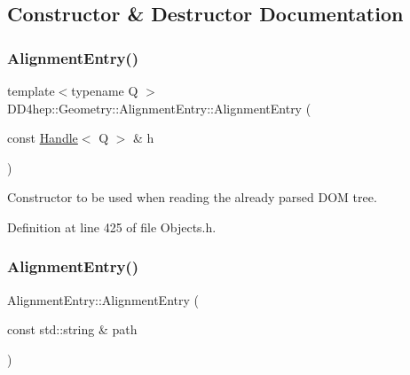 \subsection{Constructor \& Destructor Documentation}
\hypertarget{class_d_d4hep_1_1_geometry_1_1_alignment_entry_ad4ffe383c34e94bd490725fedbc4607c}{}\label{class_d_d4hep_1_1_geometry_1_1_alignment_entry_ad4ffe383c34e94bd490725fedbc4607c} 
\subsubsection{\texorpdfstring{Alignment\+Entry()}{AlignmentEntry()}\hspace{0.1cm}{\footnotesize\ttfamily [1/2]}}
{\footnotesize\ttfamily template$<$typename Q $>$ \\
D\+D4hep\+::\+Geometry\+::\+Alignment\+Entry\+::\+Alignment\+Entry (\begin{DoxyParamCaption}\item[{const \hyperlink{class_d_d4hep_1_1_handle}{Handle}$<$ Q $>$ \&}]{h }\end{DoxyParamCaption})\hspace{0.3cm}{\ttfamily [inline]}}



Constructor to be used when reading the already parsed D\+OM tree. 



Definition at line 425 of file Objects.\+h.

\hypertarget{class_d_d4hep_1_1_geometry_1_1_alignment_entry_aea78cab8d4289851bfa9118625e24185}{}\label{class_d_d4hep_1_1_geometry_1_1_alignment_entry_aea78cab8d4289851bfa9118625e24185} 
\subsubsection{\texorpdfstring{Alignment\+Entry()}{AlignmentEntry()}\hspace{0.1cm}{\footnotesize\ttfamily [2/2]}}
{\footnotesize\ttfamily Alignment\+Entry\+::\+Alignment\+Entry (\begin{DoxyParamCaption}\item[{const std\+::string \&}]{path }\end{DoxyParamCaption})}



